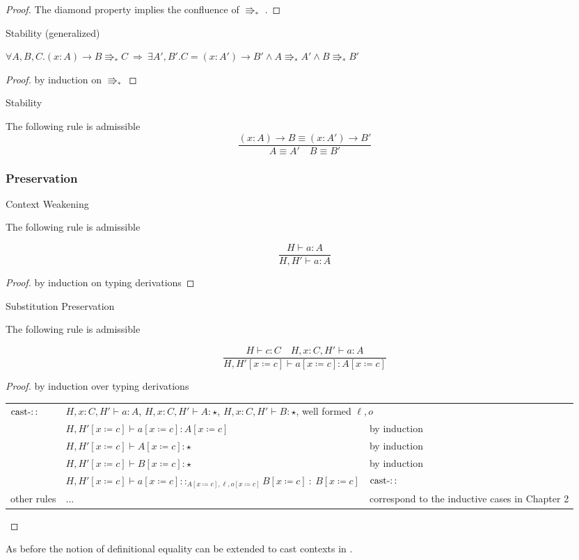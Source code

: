 \begin{proof}
The diamond property implies the confluence of $\Rrightarrow_{\ast}$
.
\end{proof}
\begin{lem}
Stability (generalized)

$\forall A,B,C.\left(x:A\right)\rightarrow B\Rrightarrow_{\ast}C\:\Rightarrow\:\exists A',B'.C=\left(x:A'\right)\rightarrow B'\land A\Rrightarrow_{\ast}A'\land B\Rrightarrow_{\ast}B'$
\end{lem}

\begin{proof}
by induction on $\Rrightarrow_{\ast}$
\end{proof}
\begin{cor}
Stability

The following rule is admissible
\[
\frac{\left(x:A\right)\rightarrow B\equiv\left(x:A'\right)\rightarrow B'}{A\equiv A'\quad B\equiv B'}
\]
\end{cor}


\subsubsection{Preservation}
\begin{lem}
Context Weakening

The following rule is admissible

\[
\frac{H\vdash a:A}{H,H'\vdash a:A}
\]
\end{lem}

\begin{proof}
by induction on typing derivations
\end{proof}
\begin{lem}
Substitution Preservation

The following rule is admissible

\[
\frac{H\vdash c:C\quad H,x:C,H'\vdash a:A}{H,H'\left[x\coloneqq c\right]\vdash a\left[x\coloneqq c\right]:A\left[x\coloneqq c\right]}
\]
\end{lem}

\begin{proof}
by induction over typing derivations

\begin{tabular}{lll}
$\operatorname{cast-::}$ & \multicolumn{2}{l}{$H,x:C,H'\vdash a:A$, $H,x:C,H'\vdash A:\star$, $H,x:C,H'\vdash B:\star$, well formed $\ensuremath{\ell},o$}\tabularnewline
 & $H,H'\left[x\coloneqq c\right]\vdash a\left[x\coloneqq c\right]:A\left[x\coloneqq c\right]$ & by induction\tabularnewline
 & $H,H'\left[x\coloneqq c\right]\vdash A\left[x\coloneqq c\right]:\star$ & by induction\tabularnewline
 & $H,H'\left[x\coloneqq c\right]\vdash B\left[x\coloneqq c\right]:\star$ & by induction\tabularnewline
 & $H,H'\left[x\coloneqq c\right]\vdash a\left[x\coloneqq c\right]::_{A\left[x\coloneqq c\right],\ensuremath{\ell},o\left[x\coloneqq c\right]}B\left[x\coloneqq c\right]\::\:B\left[x\coloneqq c\right]$ & $\operatorname{cast-::}$\tabularnewline
other rules & ... & correspond to the inductive cases in Chapter 2\tabularnewline
\end{tabular}
\end{proof}
As before the notion of definitional equality can be extended to cast contexts in .

